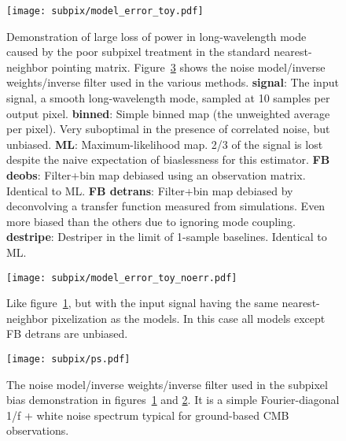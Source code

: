 \documentclass[twocolumn,apj]{aastex63}
\newcommand{\dfn}[1]{\textbf{#1}}
\begin{document}
\begin{figure}
	\centering
	\texttt{[image: subpix/model\_error\_toy.pdf]}
	\caption{
		Demonstration of large loss of power in long-wavelength mode
		caused by the poor subpixel treatment in the standard nearest-neighbor pointing matrix.
		Figure~\ref{fig:ps} shows the noise model/inverse weights/inverse filter
		used in the various methods.
		\dfn{signal}: The input signal, a smooth long-wavelength mode,
		sampled at 10 samples per output pixel.
		\dfn{binned}: Simple binned map (the unweighted average per pixel).
		Very suboptimal in the presence of correlated noise, but unbiased.
		\dfn{ML}: Maximum-likelihood map. 2/3 of the signal is lost despite
		the naive expectation of biaslessness for this estimator.
		\dfn{FB deobs}: Filter+bin map debiased using an observation matrix.
		Identical to ML.
		\dfn{FB detrans}: Filter+bin map debiased by deconvolving a
		transfer function measured from simulations. Even more biased
		than the others due to ignoring mode coupling.
		\dfn{destripe}: Destriper in the limit of 1-sample baselines.
		Identical to ML.
	}
	\label{fig:subpix-bias}
\end{figure}

\begin{figure}
	\centering
	\texttt{[image: subpix/model\_error\_toy\_noerr.pdf]}
	\caption{
		Like figure~\ref{fig:subpix-bias}, but with the input signal
		having the same nearest-neighbor pixelization as the models.
		In this case all models except FB detrans are unbiased.
	}
	\label{fig:subpix-noerr}
\end{figure}

\begin{figure}
	\centering
	\texttt{[image: subpix/ps.pdf]}
	\caption{
		The noise model/inverse weights/inverse filter used in the subpixel
		bias demonstration in figures~\ref{fig:subpix-bias} and \ref{fig:subpix-noerr}.
		It is a simple Fourier-diagonal 1/f + white noise spectrum
		typical for ground-based CMB observations.
	}
	\label{fig:ps}
\end{figure}



\end{document}
